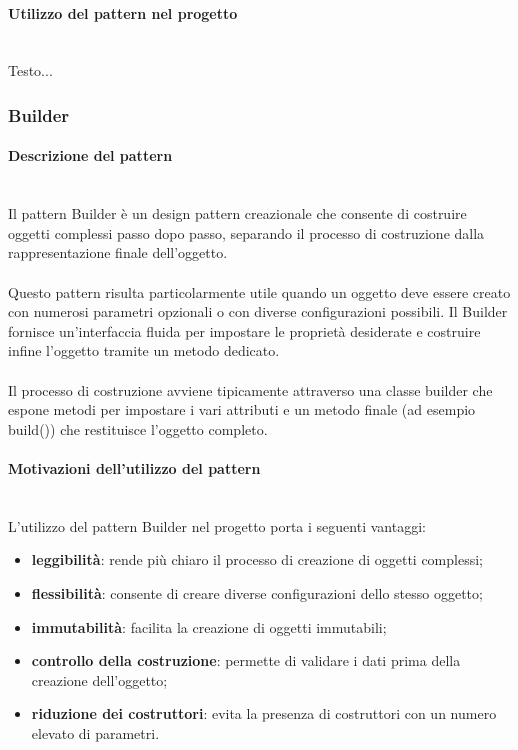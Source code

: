\documentclass[a4paper,12pt]{article}
\begin{document}
{{{                \paragraph{ Utilizzo del pattern nel progetto}\mbox{}\\
                Testo...
            }
            \subsubsection{Builder} {
                \paragraph{Descrizione del pattern}\mbox{}\\
                Il pattern Builder è un design pattern creazionale che consente di costruire oggetti complessi passo dopo passo, separando il processo di costruzione dalla rappresentazione finale dell’oggetto.\\
                \\
                Questo pattern risulta particolarmente utile quando un oggetto deve essere creato con numerosi parametri opzionali o con diverse configurazioni possibili. Il Builder fornisce un’interfaccia fluida per impostare le proprietà desiderate e costruire infine l’oggetto tramite un metodo dedicato.\\
                \\
                Il processo di costruzione avviene tipicamente attraverso una classe builder che espone metodi per impostare i vari attributi e un metodo finale (ad esempio build()) che restituisce l’oggetto completo.
                
                \paragraph{Motivazioni dell’utilizzo del pattern}\mbox{}\\
                L’utilizzo del pattern Builder nel progetto porta i seguenti vantaggi:
                \begin{itemize}
                    \item \textbf{leggibilità}: rende più chiaro il processo di creazione di oggetti complessi;
                    \item \textbf{flessibilità}: consente di creare diverse configurazioni dello stesso oggetto;
                    \item \textbf{immutabilità}: facilita la creazione di oggetti immutabili;
                    \item \textbf{controllo della costruzione}: permette di validare i dati prima della creazione dell’oggetto;
                    \item \textbf{riduzione dei costruttori}: evita la presenza di costruttori con un numero elevato di parametri.
                \end{itemize}
                
}}}
\end{document}
